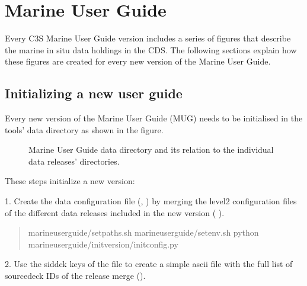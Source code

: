 \documentclass[letterpaper,10pt,english]{sphinxmanual}
\let\sphinxpxdimen\pdfpxdimen\else\newdimen\sphinxpxdimen
\begin{document}
\chapter{Marine User Guide}
\label{\detokenize{index:marine-user-guide}}\label{\detokenize{index:id2}}
Every C3S Marine User Guide version includes a series of figures that describe
the marine in situ data holdings in the CDS. The following sections explain how
these figures are created for every new version of the Marine User Guide.


\section{Initializing a new user guide}
\label{\detokenize{index:initializing-a-new-user-guide}}\label{\detokenize{index:init-mug}}
Every new version of the Marine User Guide (MUG) needs to be initialised in the
tools’ data directory as shown in the figure.

\begin{figure}[htbp]
\centering
\capstart

\noindent\sphinxincludegraphics[width=300\sphinxpxdimen]{{file_links}.png}
\caption{Marine User Guide data directory and its relation to the individual data releases’ directories.}\label{\detokenize{index:id20}}\label{\detokenize{index:file-links}}\end{figure}

These steps initialize a new version:

1. Create the data configuration file (, {\hyperref[\detokenize{index:mug-config}]{}}) by merging the level2 configuration files of the different data releases included in the new version ( {\hyperref[\detokenize{index:level2}]{}}).
\begin{quote}

\begin{sphinxVerbatim}[commandchars=\\\{\}]
 marine\PYGZhy{}user\PYGZhy{}guide/setpaths.sh
 marine\PYGZhy{}user\PYGZhy{}guide/setenv.sh
python marine\PYGZhy{}user\PYGZhy{}guide/init\PYGZus{}version/init\PYGZus{}config.py
\end{sphinxVerbatim}
\end{quote}

2. Use the sid\sphinxhyphen{}dck keys of the  file to create a simple ascii file with the full list of source\sphinxhyphen{}deck IDs of the release merge ().
\end{document}
